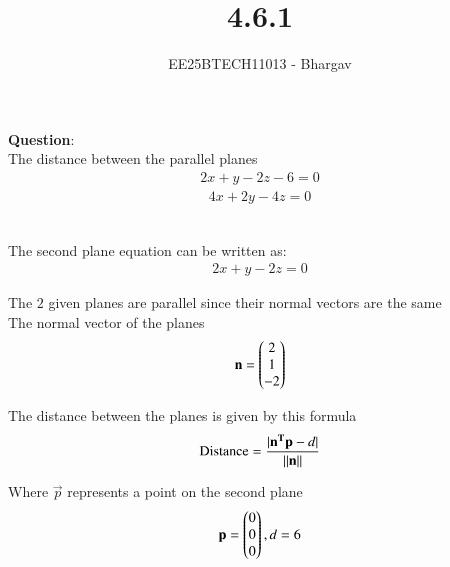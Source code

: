 \documentclass[journal]{IEEEtran}
\begin{document}

\vspace{3cm}

\title{4.6.1}
\author{EE25BTECH11013 - Bhargav}
\maketitle
{\let\newpage\relax\maketitle}

\renewcommand{\thefigure}{\theenumi}
\renewcommand{\thetable}{\theenumi}
\setlength{\intextsep}{10pt} %


\renewcommand{\thetable}{\theenumi}

\textbf{Question}:\\
The distance between the parallel planes 
\begin{align}
2x + y - 2z - 6 = 0
\end{align}
\begin{align}
4x + 2y - 4z = 0
\end{align}

\solution \\

The second plane equation can be written as:
\begin{align}
2x + y - 2z = 0
\end{align}

The $2$ given planes are parallel since their normal vectors are the same\\

The normal vector of the planes
\begin{align}
\mathbf{n} = \begin{pmatrix}2 \\ 1 \\ -2\end{pmatrix}
\end{align}

The distance between the planes is given by this formula
\begin{align}
\text{Distance} = \frac{|\mathbf{n^T} \mathbf{p} - d|}{\left\lVert\mathbf{n}\right\rVert}
\end{align}

Where $\vec{p}$ represents a point on the second plane\\
\begin{align}
\mathbf{p} = \begin{pmatrix}0 \\ 0 \\ 0\end{pmatrix}, d=6 
\end{align}
\end{document}
